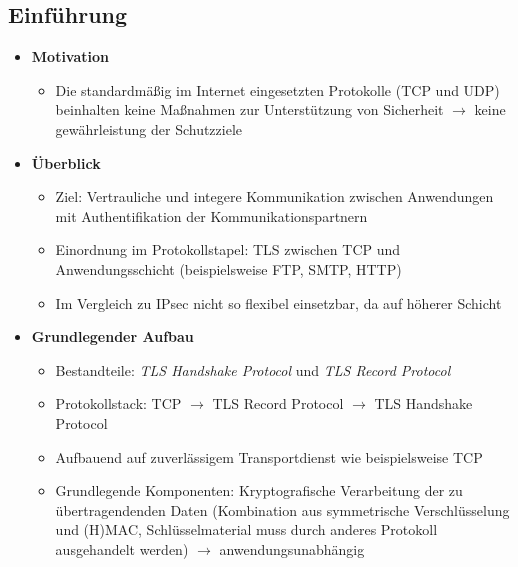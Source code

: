\subsection{Einführung}
\begin{itemize}
	\item \textbf{Motivation}
	\begin{itemize}
		\item Die standardmäßig im Internet eingesetzten Protokolle (TCP und UDP) beinhalten keine Maßnahmen zur Unterstützung von Sicherheit \(\rightarrow\) keine gewährleistung der Schutzziele
	\end{itemize}
	\item \textbf{Überblick}
	\begin{itemize}
		\item Ziel: Vertrauliche und integere Kommunikation zwischen Anwendungen mit Authentifikation der Kommunikationspartnern
		\item Einordnung im Protokollstapel: TLS zwischen TCP und Anwendungsschicht (beispielsweise FTP, SMTP, HTTP)
		\item Im Vergleich zu IPsec nicht so flexibel einsetzbar, da auf höherer Schicht
	\end{itemize}
	\item \textbf{Grundlegender Aufbau}
	\begin{itemize}
		\item Bestandteile: \textit{TLS Handshake Protocol} und \textit{TLS Record Protocol}
		\item Protokollstack: TCP \(\rightarrow\) TLS Record Protocol \(\rightarrow\) TLS Handshake Protocol
		\item Aufbauend auf zuverlässigem Transportdienst wie beispielsweise TCP
		\item Grundlegende Komponenten: Kryptografische Verarbeitung der zu übertragendenden Daten (Kombination aus symmetrische Verschlüsselung und (H)MAC, Schlüsselmaterial muss durch anderes Protokoll ausgehandelt werden) \(\rightarrow\) anwendungsunabhängig
	\end{itemize}
\end{itemize}


